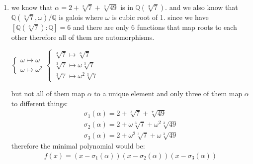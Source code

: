 \begin{enumerate}[label=]
    \item
          we know that $\alpha = 2 + \sqrt[3]{7} + \sqrt[3]{49}$ is in $\mathbb Q(\sqrt[3]{7})$.
          and we also know that $\mathbb Q(\sqrt[3]{7}, \omega) / \mathbb Q$ is galois where $\omega$ is cubic root of 1.
          since we have $[\mathbb Q(\sqrt[3]{7}): \mathbb Q] = 6$ and there are only 6 functions that map roots to each other therefore all of them are automorphisms.
        \begin{center}
            $
            \begin{cases}
                \omega \mapsto \omega \\
                \omega \mapsto \omega^2
            \end{cases}
            \begin{cases}
                \sqrt[3]{7} \mapsto \sqrt[3]{7}   \\
                \sqrt[3]{7} \mapsto \omega \sqrt[3]{7} \\
                \sqrt[3]{7} \mapsto \omega^2 \sqrt[3]{7}
            \end{cases}
            $
        \end{center}
        but not all of them map $\alpha$ to a unique element and only three of them map $\alpha$ to different things:
        \begin{gather*}
            \sigma_1(\alpha) = 2 + \sqrt[3]{7} + \sqrt[7]{49} \\
            \sigma_2(\alpha) = 2 + \omega \sqrt[3]{7} + \omega^2 \sqrt[3]{49} \\
            \sigma_3(\alpha) = 2 + \omega^2 \sqrt[3]{7} + \omega \sqrt[3]{49}
        \end{gather*}
        therefore the minimal polynomial would be:
        \begin{gather*}
            f(x) = (x - \sigma_1(\alpha))(x - \sigma_2(\alpha))(x - \sigma_3(\alpha))
        \end{gather*}

        
\end{enumerate}
